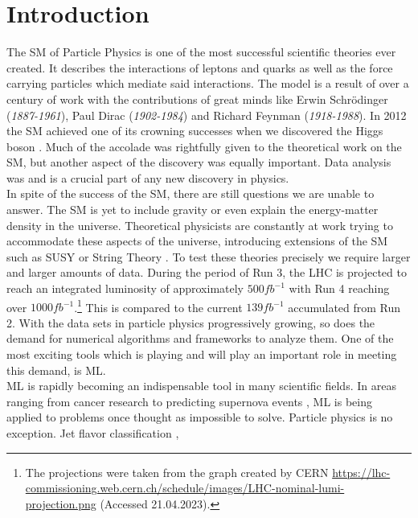 \chapter*{Introduction}
The \ac{SM} of Particle Physics is one of the most successful scientific theories ever
created. It describes the interactions of leptons and quarks as well as the force
carrying particles which mediate said interactions. The model is a result of over a century of work
with the contributions of great minds like Erwin Schrödinger (\emph{1887-1961}), Paul Dirac (\emph{1902-1984}) and Richard Feynman (\emph{1918-1988}).
In 2012 the \ac{SM} achieved one of its crowning successes when we discovered the Higgs boson \cite{Aad_2012,the_cms_collaboration_observation_2012}. 
Much of the accolade was rightfully given to the theoretical work on the \ac{SM}, but another aspect of the discovery 
was equally important. Data analysis was and is a crucial part of any new discovery in physics. \newline
\\
In spite of the success of the \ac{SM}, there are still questions we are unable to answer.
The \ac{SM} is yet to include gravity or even explain the energy-matter density in the universe. Theoretical 
physicists are constantly at work trying to accommodate these aspects of the universe,
introducing extensions of the \ac{SM} such as \ac{SUSY} \cite{SUSY} or String Theory \cite{cole_probing_2021}. To test these theories precisely
we require larger and larger amounts of data. During the period of Run 3, the \ac{LHC} is projected to reach an integrated luminosity of approximately  
$500fb^{-1}$ with Run 4 reaching over $1000fb^{-1}$.\footnote{The projections were taken from the graph created by CERN
\url{https://lhc-commissioning.web.cern.ch/schedule/images/LHC-nominal-lumi-projection.png}
(Accessed 21.04.2023).} This is compared to the current $139fb^{-1}$ accumulated from Run 2. With the data sets in particle physics progressively growing, 
so does the demand for numerical algorithms and frameworks to analyze them. One of the most exciting tools which is playing and will play an important role in meeting 
this demand, is \acf{ML}.\newline
\\
\ac{ML} is rapidly becoming an indispensable tool in many scientific fields.
In areas ranging from cancer research \cite{SkinCancer} to predicting supernova events \cite{moller_photometric_2016}, \ac{ML} is being applied to problems
once thought as impossible to solve. Particle physics is no exception. Jet flavor classification \cite{Guest_2016}, 

